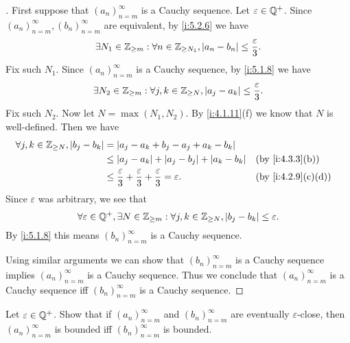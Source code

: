 \begin{proof}[]
  First suppose that \((a_n)_{n = m}^\infty\) is a Cauchy sequence.
  Let \(\varepsilon \in \mathbb{Q}^+\).
  Since \((a_n)_{n = m}^\infty, (b_n)_{n = m}^\infty\) are equivalent, by \cref{i:5.2.6} we have
  \[
    \exists N_1 \in \mathbb{Z}_{\geq m} : \forall n \in \mathbb{Z}_{\geq N_1}, \left\lvert a_n - b_n\right\rvert \leq \dfrac{\varepsilon}{3}.
  \]
  Fix such \(N_1\).
  Since \((a_n)_{n = m}^\infty\) is a Cauchy sequence, by \cref{i:5.1.8} we have
  \[
    \exists N_2 \in \mathbb{Z}_{\geq m} : \forall j, k \in \mathbb{Z}_{\geq N}, \left\lvert a_j - a_k\right\rvert \leq \dfrac{\varepsilon}{3}.
  \]
  Fix such \(N_2\).
  Now let \(N = \max(N_1, N_2)\).
  By \cref{i:4.1.11}(f) we know that \(N\) is well-defined.
  Then we have
  \begin{align*}
    \forall j, k \in \Z_{\geq N}, \abs{b_j - b_k} & = \abs{a_j - a_k + b_j - a_j + a_k - b_k}                                                                           \\
                                                  & \leq \abs{a_j - a_k} + \abs{a_j - b_j} + \abs{a_k - b_k}                                     &  & \by{i:4.3.3}[b]   \\
                                                  & \leq \dfrac{\varepsilon}{3} + \dfrac{\varepsilon}{3} + \dfrac{\varepsilon}{3} = \varepsilon. &  & \by{i:4.2.9}[c,d]
  \end{align*}
  Since \(\varepsilon\) was arbitrary, we see that
  \[
    \forall \varepsilon \in \mathbb{Q}^+, \exists N \in \mathbb{Z}_{\geq m} : \forall j, k \in \mathbb{Z}_{\geq N}, \left\lvert b_j - b_k\right\rvert \leq \varepsilon.
  \]
  By \cref{i:5.1.8} this means \((b_n)_{n = m}^\infty\) is a Cauchy sequence.

  Using similar arguments we can show that \((b_n)_{n = m}^\infty\) is a Cauchy sequence implies \((a_n)_{n = m}^\infty\) is a Cauchy sequence.
  Thus we conclude that \((a_n)_{n = m}^\infty\) is a Cauchy sequence iff \((b_n)_{n = m}^\infty\) is a Cauchy sequence.
\end{proof}

\begin{ex}\label{i:ex:5.2.2}
  Let \(\varepsilon \in \mathbb{Q}^+\).
  Show that if \((a_n)_{n = m}^{\infty}\) and \((b_n)_{n = m}^{\infty}\) are eventually \(\varepsilon\)-close, then \((a_n)_{n = m}^{\infty}\) is bounded iff \((b_n)_{n = m}^{\infty}\) is bounded.
\end{ex}

